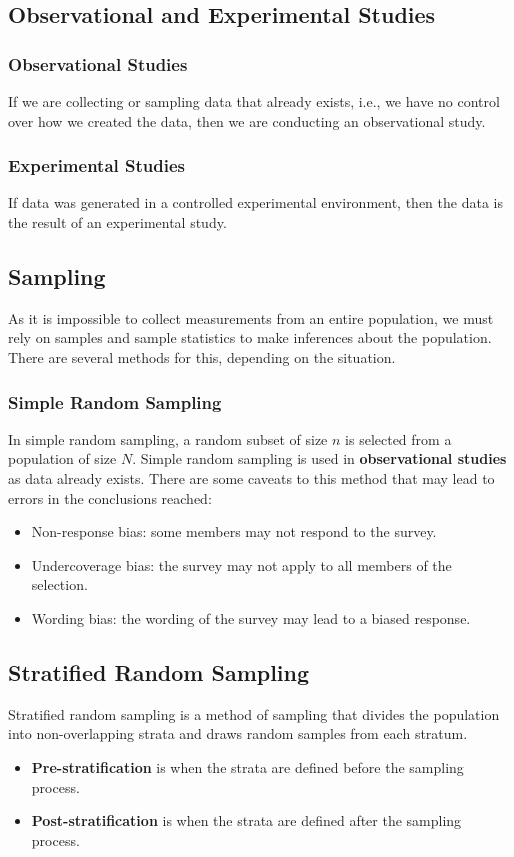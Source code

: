 \documentclass{article}
\begin{document}
\subsection{Observational and Experimental Studies}
\subsubsection{Observational Studies}
If we are collecting or sampling data that already exists, i.e., we have no control over how we created the data,
then we are conducting an observational study.
\subsubsection{Experimental Studies}
If data was generated in a controlled experimental environment, then the data is the result of an experimental study.
\subsection{Sampling}
As it is impossible to collect measurements from an entire population, we must rely on
samples and sample statistics to make inferences about the population.
There are several methods for this, depending on the situation.
\subsubsection{Simple Random Sampling}
In simple random sampling, a random subset of size \(n\) is selected from a population of size \(N\).
Simple random sampling is used in \textbf{observational studies} as data already exists.
There are some caveats to this method that may lead to errors in the conclusions reached:
\begin{itemize}
    \item Non-response bias: some members may not respond to the survey.
    \item Undercoverage bias: the survey may not apply to all members of the selection.
    \item Wording bias: the wording of the survey may lead to a biased response.
\end{itemize}
\subsection{Stratified Random Sampling}
Stratified random sampling is a method of sampling that divides the population into non-overlapping strata
and draws random samples from each stratum.
\begin{itemize}
    \item \textbf{Pre-stratification} is when the strata are defined before the sampling process.
    \item \textbf{Post-stratification} is when the strata are defined after the sampling process.
\end{itemize}
\end{document}
